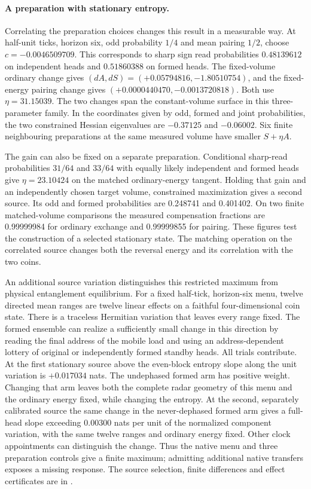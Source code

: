\documentclass[11pt]{article}
\begin{document}
\paragraph{A preparation with stationary entropy.}
Correlating the preparation choices changes this result in a measurable
way. At half-unit ticks, horizon six, odd probability $1/4$ and mean
pairing $1/2$, choose $c=-0.0046509709$. This corresponds to sharp
sign read probabilities $0.48139612$ on independent heads and
$0.51860388$ on formed heads. The fixed-volume ordinary change
gives $(dA,dS)=(+0.05794816,-1.80510754)$, and the fixed-energy
pairing change gives $(+0.0000440470,-0.0013720818)$. Both use
$\eta=31.15039$. The two changes span the constant-volume surface
in this three-parameter family. In the coordinates given by odd,
formed and joint probabilities, the two constrained Hessian
eigenvalues are $-0.37125$ and $-0.06002$. Six finite neighbouring
preparations at the same measured volume have smaller $S+\eta A$.

The gain can also be fixed on a separate preparation. Conditional
sharp-read probabilities $31/64$ and $33/64$ with equally likely
independent and formed heads give $\eta=23.10424$ on the matched
ordinary-energy tangent. Holding that gain and an independently
chosen target volume, constrained maximization gives a second source.
Its odd and formed probabilities are 0.248741 and 0.401402. On
two finite matched-volume comparisons the measured compensation
fractions are 0.99999984 for ordinary exchange and 0.99999855 for
pairing. These figures test the construction of a selected stationary
state. The matching operation on the correlated source changes both
the reversal energy and its correlation with the two coins.

An additional source variation distinguishes this restricted maximum
from physical entanglement equilibrium. For a fixed half-tick,
horizon-six menu, twelve directed mean ranges are twelve linear
effects on a faithful four-dimensional coin state. There is a
traceless Hermitian variation that leaves every range fixed. The
formed ensemble can realize a sufficiently small change in this
direction by reading the final address of the mobile load and using
an address-dependent lottery of original or independently formed
standby heads. All trials contribute. At the first stationary
source above the even-block entropy slope along the unit variation
is $+0.017034$ nats. The undephased formed arm has positive weight.
Changing that arm leaves both the complete radar geometry of this
menu and the ordinary energy fixed, while changing the entropy.
At the second, separately calibrated source the same change in the
never-dephased formed arm gives a full-head slope exceeding $0.00300$
nats per unit of the normalized component variation, with the same
twelve ranges and ordinary energy fixed. Other clock appointments
can distinguish the change. Thus the
native menu and three preparation controls give a finite maximum;
admitting additional native transfers exposes a missing response.
The source selection, finite differences and effect certificates
are in .
\end{document}

